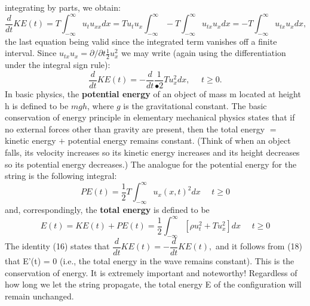 \documentclass[../main.tex]{subfiles}
\begin{document}
{{integrating by parts, we obtain:
$$
\frac{d}{dt} KE(t)=T \int_{-\infty}^{\infty} u_t u_{xx} dx=Tu_t u_x \int_{-\infty}^{\infty} -T \int_{-\infty}^{\infty} u_{tx} u_x dx =-T \int_{-\infty}^{\infty} u_{tx} u_x dx,
$$
the last equation being valid since the integrated term vanishes off a finite interval. Since $u_{tx} u_x = \partial / \partial t \frac{1}{2} u_x^2$ we may write (again using the differentiation under the 
integral sign rule):
\begin{equation}
\dfrac{d}{dt} KE(t)= -\dfrac{d}{dt}  \dfrac{1}{•2} Tu_{x}^{2} dx, ~~~~~~t\geq 0.
\end{equation}
In basic physics, the \textbf{potential energy} of an object of mass m located at height h is 
defined to be $mgh$, where $g$ is the gravitational constant. The basic conservation of 
energy principle in elementary mechanical physics states that if no external forces 
other than gravity are present, then the total energy $=$ kinetic energy $+$ potential 
energy remains constant. (Think of when an object falls, its velocity increases so 
its kinetic energy increases and its height decreases so its potential energy 
decreases.) The analogue for the potential energy for the string is the following 
integral: 
\begin{equation}
PE(t)=\dfrac{1}{2} T \int_{-\infty}^{\infty} u_x (x,t)^2 dx ~~~~~~t\geq 0
\end{equation}
and, correspondingly, the \textbf{total energy} is defined to be
\begin{equation}
E(t)=KE(t)+PE(t)=\dfrac{1}{2} \int_{-\infty}^{\infty} [\rho u_t^2 + Tu_x^2] dx ~~~~~~t\geq 0
\end{equation}
The identity (16) states that $\dfrac{d}{dt} KE(t)=-\dfrac{d}{dt} KE(t),$ and it follows from (18) that E'(t) = 0 (i.e., the total energy in the wave remains constant). This is the 
conservation of energy. It is extremely important and noteworthy! Regardless of 
how long we let the string propagate, the total energy E of the configuration will 
remain unchanged. 
\\
\\
}}
\end{document}
